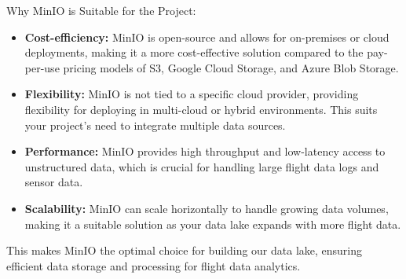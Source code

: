 \documentclass[12pt,a4paper]{article}
\begin{document}
Why MinIO is Suitable for the Project:
\begin{itemize}
    \item \textbf{Cost-efficiency:} MinIO is open-source and allows for
    on-premises or cloud deployments, making it a more cost-effective solution
    compared to the pay-per-use pricing models of S3, Google Cloud Storage, and
    Azure Blob Storage.
    \item \textbf{Flexibility:} MinIO is not tied to a specific cloud provider,
    providing flexibility for deploying in multi-cloud or hybrid environments.
    This suits your project’s need to integrate multiple data sources.
    \item \textbf{Performance:} MinIO provides high throughput and low-latency
    access to unstructured data, which is crucial for handling large flight data
    logs and sensor data.
    \item \textbf{Scalability:} MinIO can scale horizontally to handle growing
    data volumes, making it a suitable solution as your data lake expands with
    more flight data.
\end{itemize}
This makes MinIO the optimal choice for building our data lake, ensuring
efficient data storage and processing for flight data analytics.
\end{document}
